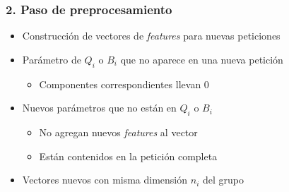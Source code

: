 \begin{frame}
    \frametitle{2. Paso de preprocesamiento}

    \begin{itemize}[<2->]
        \item
        Construcción de vectores de \textit{features} para nuevas peticiones

        \item
        Parámetro de $Q_{i}$ o $B_{i}$ que no aparece en una nueva petición

        \begin{itemize}[<.->]
            \item
            Componentes correspondientes llevan 0
        \end{itemize}

        \item
        Nuevos parámetros que no están en $Q_{i}$ o $B_{i}$

        \begin{itemize}[<.->]
            \item
            No agregan nuevos \textit{features} al vector

            \item
            Están contenidos en la petición completa
        \end{itemize}

        \item
        Vectores nuevos con misma dimensión $n_{i}$ del grupo
    \end{itemize}
\end{frame}

